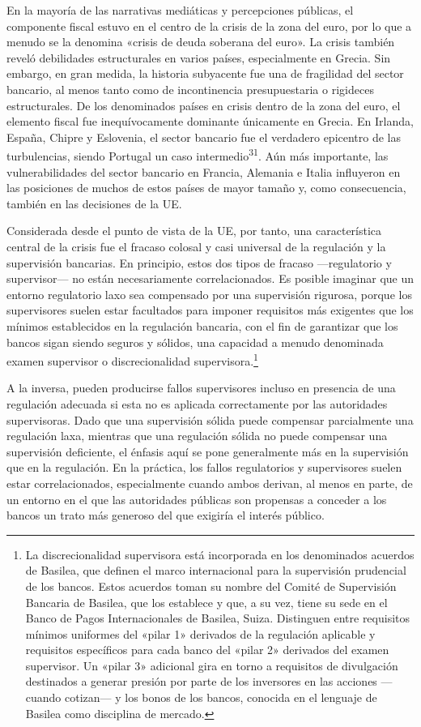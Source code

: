 \documentclass[10pt,a4paper]{article}
\begin{document}
{En la mayoría de las narrativas mediáticas y percepciones públicas, el componente fiscal estuvo en el centro de la crisis de la zona del euro, por lo que a menudo se la denomina «crisis de deuda soberana del euro». La crisis también reveló debilidades estructurales en varios países, especialmente en Grecia. Sin embargo, en gran medida, la historia subyacente fue una de fragilidad del sector bancario, al menos tanto como de incontinencia presupuestaria o rigideces estructurales. De los denominados países en crisis dentro de la zona del euro, el elemento fiscal fue inequívocamente dominante únicamente en Grecia. En Irlanda, España, Chipre y Eslovenia, el sector bancario fue el verdadero epicentro de las turbulencias, siendo Portugal un caso intermedio\textsuperscript{31}. Aún más importante, las vulnerabilidades del sector bancario en Francia, Alemania e Italia influyeron en las posiciones de muchos de estos países de mayor tamaño y, como consecuencia, también en las decisiones de la UE.

Considerada desde el punto de vista de la UE, por tanto, una característica central de la crisis fue el fracaso colosal y casi universal de la regulación y la supervisión bancarias. En principio, estos dos tipos de fracaso —regulatorio y supervisor— no están necesariamente correlacionados. Es posible imaginar que un entorno regulatorio laxo sea compensado por una supervisión rigurosa, porque los supervisores suelen estar facultados para imponer requisitos más exigentes que los mínimos establecidos en la regulación bancaria, con el fin de garantizar que los bancos sigan siendo seguros y sólidos, una capacidad a menudo denominada examen supervisor o discrecionalidad supervisora.\footnote{
La discrecionalidad supervisora está incorporada en los denominados acuerdos de Basilea, que definen el marco internacional para la supervisión prudencial de los bancos. Estos acuerdos toman su nombre del Comité de Supervisión Bancaria de Basilea, que los establece y que, a su vez, tiene su sede en el Banco de Pagos Internacionales de Basilea, Suiza. Distinguen entre requisitos mínimos uniformes del «pilar 1» derivados de la regulación aplicable y requisitos específicos para cada banco del «pilar 2» derivados del examen supervisor. Un «pilar 3» adicional gira en torno a requisitos de divulgación destinados a generar presión por parte de los inversores en las acciones —cuando cotizan— y los bonos de los bancos, conocida en el lenguaje de Basilea como disciplina de mercado.
}

A la inversa, pueden producirse fallos supervisores incluso en presencia de una regulación adecuada si esta no es aplicada correctamente por las autoridades supervisoras. Dado que una supervisión sólida puede compensar parcialmente una regulación laxa, mientras que una regulación sólida no puede compensar una supervisión deficiente, el énfasis aquí se pone generalmente más en la supervisión que en la regulación. En la práctica, los fallos regulatorios y supervisores suelen estar correlacionados, especialmente cuando ambos derivan, al menos en parte, de un entorno en el que las autoridades públicas son propensas a conceder a los bancos un trato más generoso del que exigiría el interés público.

}
\end{document}
